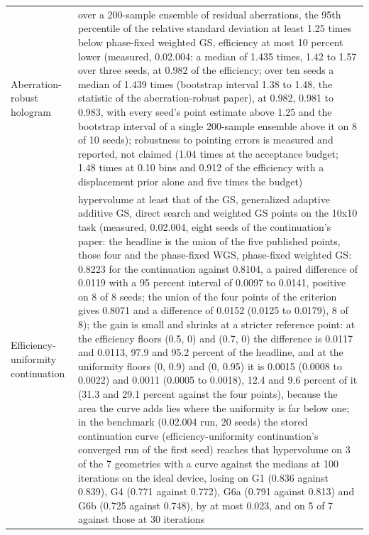 \begin{longtable}{@{}>{\raggedright\arraybackslash}p{} >{\raggedright\arraybackslash}p{}@{}}
Aberration-robust hologram & \footnotesize over a 200-sample ensemble of residual aberrations, the 95th percentile of the relative standard deviation at least 1.25 times below phase-fixed weighted GS, efficiency at most 10 percent lower (measured, 0.02.004: a median of 1.435 times, 1.42 to 1.57 over three seeds, at 0.982 of the efficiency; over ten seeds a median of 1.439 times (bootstrap interval 1.38 to 1.48, the statistic of the aberration-robust paper), at 0.982, 0.981 to 0.983, with every seed's point estimate above 1.25 and the bootstrap interval of a single 200-sample ensemble above it on 8 of 10 seeds); robustness to pointing errors is measured and reported, not claimed (1.04 times at the acceptance budget; 1.48 times at 0.10 bins and 0.912 of the efficiency with a displacement prior alone and five times the budget)\\
Efficiency-uniformity continuation & \footnotesize hypervolume at least that of the GS, generalized adaptive additive GS, direct search and weighted GS points on the 10x10 task (measured, 0.02.004, eight seeds of the continuation's paper: the headline is the union of the five published points, those four and the phase-fixed WGS, phase-fixed weighted GS: 0.8223 for the continuation against 0.8104, a paired difference of 0.0119 with a 95 percent interval of 0.0097 to 0.0141, positive on 8 of 8 seeds; the union of the four points of the criterion gives 0.8071 and a difference of 0.0152 (0.0125 to 0.0179), 8 of 8); the gain is small and shrinks at a stricter reference point: at the efficiency floors (0.5, 0) and (0.7, 0) the difference is 0.0117 and 0.0113, 97.9 and 95.2 percent of the headline, and at the uniformity floors (0, 0.9) and (0, 0.95) it is 0.0015 (0.0008 to 0.0022) and 0.0011 (0.0005 to 0.0018), 12.4 and 9.6 percent of it (31.3 and 29.1 percent against the four points), because the area the curve adds lies where the uniformity is far below one; in the benchmark (0.02.004 run, 20 seeds) the stored continuation curve (efficiency-uniformity continuation's converged run of the first seed) reaches that hypervolume on 3 of the 7 geometries with a curve against the medians at 100 iterations on the ideal device, losing on G1 (0.836 against 0.839), G4 (0.771 against 0.772), G6a (0.791 against 0.813) and G6b (0.725 against 0.748), by at most 0.023, and on 5 of 7 against those at 30 iterations\\
\bottomrule\end{longtable}
